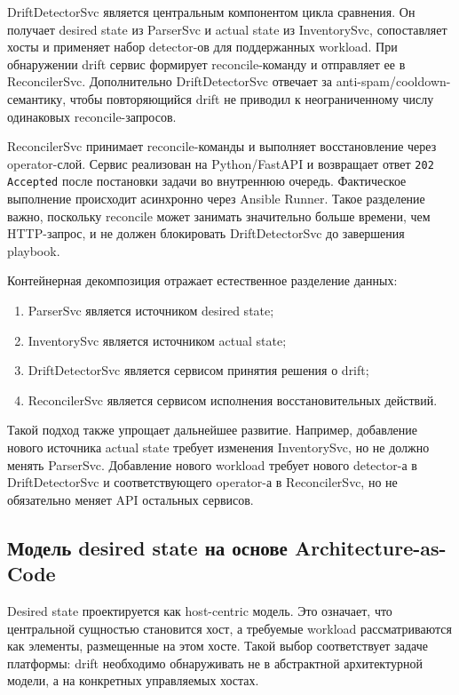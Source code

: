 DriftDetectorSvc является центральным компонентом цикла сравнения. Он получает desired state из ParserSvc и actual state из InventorySvc, сопоставляет хосты и применяет набор detector-ов для поддержанных workload. При обнаружении drift сервис формирует reconcile-команду и отправляет ее в ReconcilerSvc. Дополнительно DriftDetectorSvc отвечает за anti-spam/cooldown-семантику, чтобы повторяющийся drift не приводил к неограниченному числу одинаковых reconcile-запросов.

ReconcilerSvc принимает reconcile-команды и выполняет восстановление через operator-слой. Сервис реализован на Python/FastAPI и возвращает ответ \texttt{202 Accepted} после постановки задачи во внутреннюю очередь. Фактическое выполнение происходит асинхронно через Ansible Runner. Такое разделение важно, поскольку reconcile может занимать значительно больше времени, чем HTTP-запрос, и не должен блокировать DriftDetectorSvc до завершения playbook.

Контейнерная декомпозиция отражает естественное разделение данных:
\begin{enumerate}
    \item ParserSvc является источником desired state;
    \item InventorySvc является источником actual state;
    \item DriftDetectorSvc является сервисом принятия решения о drift;
    \item ReconcilerSvc является сервисом исполнения восстановительных действий.
\end{enumerate}

Такой подход также упрощает дальнейшее развитие. Например, добавление нового источника actual state требует изменения InventorySvc, но не должно менять ParserSvc. Добавление нового workload требует нового detector-а в DriftDetectorSvc и соответствующего operator-а в ReconcilerSvc, но не обязательно меняет API остальных сервисов.

\subsection{Модель desired state на основе Architecture-as-Code}

Desired state проектируется как host-centric модель. Это означает, что центральной сущностью становится хост, а требуемые workload рассматриваются как элементы, размещенные на этом хосте. Такой выбор соответствует задаче платформы: drift необходимо обнаруживать не в абстрактной архитектурной модели, а на конкретных управляемых хостах.

